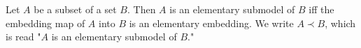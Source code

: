 Let $A$ be a subset of a set $B$. Then $A$ is an elementary submodel of $B$ iff the embedding map of $A$ into $B$ is an elementary embedding. We write $A \prec B$, which is read "$A$ is an elementary submodel of $B$."
